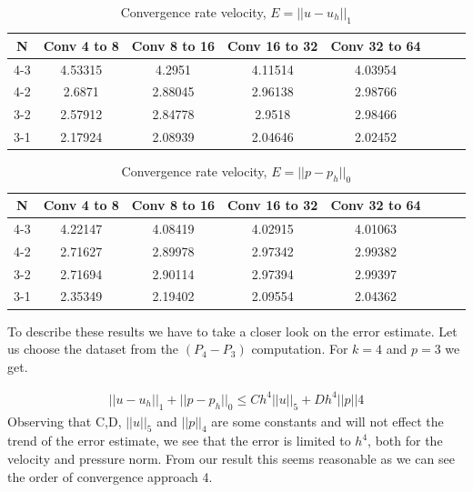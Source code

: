 \documentclass[a4paper,norsk]{article}
\begin{document}
\begin{table}[ht]
\caption {Convergence rate velocity, $E = ||u-u_h||_1$} 
\centering
\begin{tabular}{c|ccccccc}
\hline
\rowcolor{LightCyan}
N  & Conv 4 to 8  &  Conv 8 to 16  &  Conv 16 to 32 &  Conv 32 to 64 \\  
\hline
4-3   &     4.53315  &       4.2951   &        4.11514  & 4.03954 \\ \hline
4-2    &    2.6871   &       2.88045  &        2.96138 & 2.98766 \\ \hline
3-2    &    2.57912  &       2.84778  &        2.9518 & 2.98466 \\ \hline
3-1    &    2.17924  &       2.08939  &        2.04646 & 2.02452 \\
\hline
\end{tabular}
\end{table}
       

\begin{table}[ht]
\caption {Convergence rate velocity, $E = ||p-p_h||_0$} 
\centering
\begin{tabular}{c|ccccccc}
\hline
\rowcolor{LightCyan}
N  & Conv 4 to 8  &  Conv 8 to 16  &  Conv 16 to 32 &  Conv 32 to 64\\
\hline
4-3   &     4.22147   &      4.08419   &       4.02915 & 4.01063  \\ \hline
4-2   &     2.71627   &      2.89978   &       2.97342 & 2.99382  \\ \hline 
3-2   &     2.71694   &      2.90114   &       2.97394 & 2.99397   \\ \hline 
3-1   &     2.35349   &      2.19402   &       2.09554 & 2.04362   \\ 
\hline
\end{tabular}
\end{table}

To describe these results we have to take a closer look on the error estimate. Let us choose the dataset from the $(P_4 - P_3)$
computation. For $k=4$ and $p=3$ we get.  

\begin{align*}
 ||u - u_h||_1 + ||p - p_h||_0 \leq Ch^4||u||_{5} + Dh^{4} ||p||{4}
\end{align*}
Observing that C,D, $||u||_{5}$ and $||p||_{4}$ are some constants and will not effect the trend of the error estimate, we see that
the error is limited to $h^4$, both for the velocity and pressure norm. From our result this seems reasonable as we can see the order of convergence
approach 4.
\end{document}

